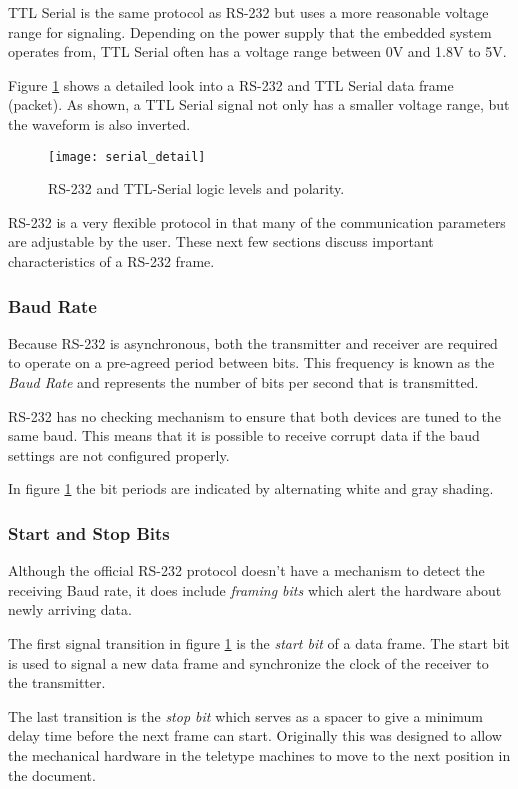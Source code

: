 \documentclass[11pt,fleqn]{book} %
\begin{document}
TTL Serial is the same protocol as RS-232 but uses a more reasonable voltage range for signaling. Depending on the power supply that the embedded system operates from, TTL Serial often has a voltage range between 0V and 1.8V to 5V. 

Figure \ref{serial_detail} shows a detailed look into a RS-232 and TTL Serial data frame (packet). As shown, a TTL Serial signal not only has a smaller voltage range, but the waveform is also inverted. 

\begin{figure}[]
    \centering\texttt{[image: serial\_detail]}
    \caption{RS-232 and TTL-Serial logic levels and polarity.}
    \label{serial_detail}
\end{figure}

RS-232 is a very flexible protocol in that many of the communication parameters are adjustable by the user. These next few sections discuss important characteristics of a RS-232 frame.  

\subsubsection{Baud Rate} 
Because RS-232 is asynchronous, both the transmitter and receiver are required to operate on a pre-agreed period between bits. This frequency is known as the \textit{Baud Rate} and represents the number of bits per second that is transmitted. 

RS-232 has no checking mechanism to ensure that both devices are tuned to the same baud. This means that it is possible to receive corrupt data if the baud settings are not configured properly. 

In figure \ref{serial_detail} the bit periods are indicated by alternating white and gray shading. 
 
\subsubsection{Start and Stop Bits}
Although the official RS-232 protocol doesn't have a mechanism to detect the receiving Baud rate, it does include \textit{framing bits} which alert the hardware about newly arriving data. 

The first signal transition in figure \ref{serial_detail} is the \textit{start bit} of a data frame. The start bit is used to signal a new data frame and synchronize the clock of the receiver to the transmitter.   

The last transition is the \textit{stop bit} which serves as a spacer to give a minimum delay time before the next frame can start. Originally this was designed to allow the mechanical hardware in the teletype machines to move to the next position in the document.
\end{document}
